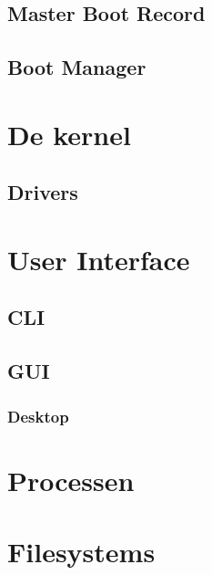 \documentclass[a4paper,12pt,twoside,openright,titlepage]{book}
\begin{document}
\section{Master Boot Record}

\section{Boot Manager}


\chapter{De kernel}

\section{Drivers}


\chapter{User Interface}

\section{CLI}

\section{GUI}

\subsection{Desktop}


\chapter{Processen}


\chapter{Filesystems}


\backmatter
\printindex
\end{document}
